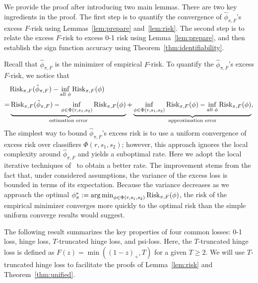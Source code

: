 \documentclass[11pt]{article}
\newcommand*{\KeepStyleUnderBrace}[1]{%
\mathop{%
\mathchoice
{\underbrace{\displaystyle#1}}%
{\underbrace{\textstyle#1}}%
{\underbrace{\scriptstyle#1}}%
{\underbrace{\scriptscriptstyle#1}}%
}\limits
}
\theoremstyle{plain}
\theoremstyle{definition}
\def\riskF{\textup{Risk}_{\pi,F}}
\begin{document}
We provide the proof after introducing two main lemmas.
There are two key ingredients in the proof. The first step is to quantify the convergence of $\hat \phi_{\pi,F}$'s excess $F$-risk using Lemmas~\ref{lem:prepare} and~\ref{lem:risk}. The second step is to relate the excess $F$-risk to excess 0-1 risk using Lemma~\ref{lem:prepare}, and then establish the sign function accuracy using Theorem~\ref{thm:identifiability}.

Recall that $\hat \phi_{\pi,F}$ is the minimizer of empirical $F$-risk.  To quantify the $\hat \phi_{\pi,F}$'s excess $F$-risk, we notice that 
\begin{align}
&\riskF(\hat \phi_{\pi,F})-\inf_{\text{all }{\phi}}\riskF(\phi)\\
=&
 \KeepStyleUnderBrace{\riskF(\hat \phi_{\pi,F})-\inf_{\phi\in\Phi(r,s_1,s_2)}\riskF(\phi)}_{\text{estimation error}}+\KeepStyleUnderBrace{
 \inf_{\phi\in\Phi(r,s_1,s_2)}\riskF(\phi)-\inf_{\text{all }\phi}\riskF(\phi)}_{\text{approximation error}},
 \end{align}
The simplest way to bound $\hat \phi_{\pi,F}$'s excess risk is to use a uniform convergence of excess risk over classifiers $\Phi(r,s_1,s_2)$; however, this approach ignores the local complexity around $\hat \phi_{\pi,F}$ and yields a suboptimal rate. Here we adopt the local iterative techniques of~\citet[Theorem 3]{wang2008probability} to obtain a better rate. The improvement stems from the fact that, under considered assumptions, the variance of the excess loss is bounded in terms of its expectation. Because the variance decreases as we approach the optimal $\phi^*_{\pi}:=\argmin_{\phi\in\Phi(r,s_1,s_2)}\riskF(\phi)$, the risk of the empirical minimizer converges more quickly to the optimal risk than the simple uniform converge results would suggest. 

The following result summarizes the key properties of four common losses: 0-1 loss, hinge loss, $T$-truncated hinge loss, and psi-loss. Here, the $T$-truncated hinge loss is defined as $F(z)=\min((1-z)_{+},T)$ for a given $T\geq 2$. We will use $T$-truncated hinge loss to facilitate the proofs of Lemma~\ref{lem:risk} and Theorem~\ref{thm:unified}. 
\end{document}
